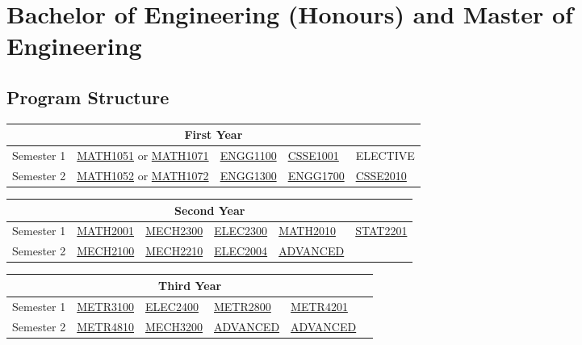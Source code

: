 \newpage

\section{Bachelor of Engineering (Honours) and Master of Engineering}
\subsection{Program Structure}
\renewcommand{\arraystretch}{1.5}
\begin{table}[H]
    \centering
    \begin{tabular}{| m{6em} | m{5em} m{5em} m{5em} m{5em} m{5em} |}
        \hline
        \multicolumn{6}{|c|}{\bfseries First Year} \\
        \hline
        Semester 1 & \multicolumn{2}{c}{\hyperlink{MATH1051}{MATH1051} or \hyperlink{MATH1071}{MATH1071}} & \hyperlink{ENGG1100}{ENGG1100} & \hyperlink{CSSE1001}{CSSE1001} & ELECTIVE \\
        Semester 2 & \multicolumn{2}{c}{\hyperlink{MATH1052}{MATH1052} or \hyperlink{MATH1072}{MATH1072}} & \hyperlink{ENGG1300}{ENGG1300} & \hyperlink{ENGG1700}{ENGG1700} & \hyperlink{CSSE2010}{CSSE2010} \\
        \hline
    \end{tabular}
\end{table}
\begin{table}[H]
    \centering
    \begin{tabular}{| m{6em} | m{5em} m{5em} m{5em} m{5em} m{5em} |}
        \hline
        \multicolumn{6}{|c|}{\bfseries Second Year} \\
        \hline
        Semester 1 & \hyperlink{MATH2001}{MATH2001} & \hyperlink{MECH2300}{MECH2300} & \hyperlink{ELEC2300}{ELEC2300} & \hyperlink{MATH2010}{MATH2010} & \hyperlink{STAT2201}{STAT2201} \\
        Semester 2 & \hyperlink{MECH2100}{MECH2100} & \hyperlink{MECH2210}{MECH2210} & \hyperlink{ELEC2004}{ELEC2004} & \hyperlink{ADVANCED}{ADVANCED} & \\
        \hline
    \end{tabular}
\end{table}
\begin{table}[H]
    \centering
    \begin{tabular}{| m{6em} | m{5em} m{5em} m{5em} m{5em} m{5em} |}
        \hline
        \multicolumn{6}{|c|}{\bfseries Third Year} \\
        \hline
        Semester 1 & \hyperlink{METR3100}{METR3100} & \hyperlink{ELEC2400}{ELEC2400} & \hyperlink{METR2800}{METR2800} & \hyperlink{METR4201}{METR4201} & \\
        Semester 2 & \hyperlink{METR4810}{METR4810} & \hyperlink{MECH3200}{MECH3200} & \hyperlink{ADVANCED}{ADVANCED} & \hyperlink{ADVANCED}{ADVANCED} & \\
        \hline
    \end{tabular}
\end{table}
